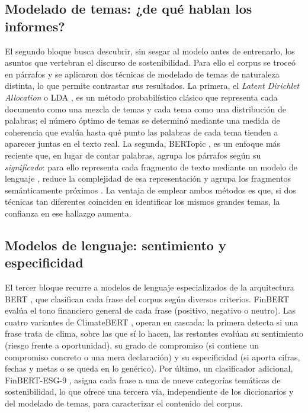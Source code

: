 \subsection{Modelado de temas: ¿de qué hablan los informes?}

El segundo bloque busca descubrir, sin sesgar al modelo antes de entrenarlo, los asuntos que vertebran el
discurso de sostenibilidad. Para ello el corpus se troceó en párrafos y se aplicaron dos
técnicas de modelado de temas de naturaleza distinta, lo que permite contrastar sus resultados.
La primera, el \textit{Latent Dirichlet Allocation} o LDA \parencite{blei2003}, es un método
probabilístico clásico que representa cada documento como una mezcla de temas y cada tema como
una distribución de palabras; el número óptimo de temas se determinó mediante una medida de
coherencia que evalúa hasta qué punto las palabras de cada tema tienden a aparecer juntas en el
texto real. La segunda, BERTopic \parencite{grootendorst2022}, es un enfoque más reciente que,
en lugar de contar palabras, agrupa los párrafos según su \textit{significado}: para ello
representa cada fragmento de texto mediante un modelo de lenguaje \parencite{reimers2019},
reduce la complejidad de esa representación \parencite{mcinnes2018} y agrupa los fragmentos
semánticamente próximos \parencite{campello2013}. La ventaja de emplear ambos métodos es que,
si dos técnicas tan diferentes coinciden en identificar los mismos grandes temas, la confianza
en ese hallazgo aumenta.

\subsection{Modelos de lenguaje: sentimiento y especificidad}

El tercer bloque recurre a modelos de lenguaje especializados de la arquitectura
BERT \parencite{devlin2019,liu2019}, que clasifican cada frase del corpus según diversos
criterios. FinBERT \parencite{araci2019} evalúa el tono financiero general de cada frase
(positivo, negativo o neutro). Las cuatro variantes de ClimateBERT
\parencite{webersinke2022}, operan en cascada:
la primera detecta si una frase trata de clima, sobre las que sí lo hacen, las restantes
evalúan su sentimiento (riesgo frente a oportunidad), su grado de compromiso (si contiene un
compromiso concreto o una mera declaración) y su especificidad (si aporta cifras, fechas y
metas o se queda en lo genérico). Por último, un clasificador adicional, FinBERT-ESG-9
\parencite{yang2020}, asigna cada frase a una de nueve categorías temáticas de sostenibilidad,
lo que ofrece una tercera vía, independiente de los diccionarios y del modelado de temas, para
caracterizar el contenido del corpus.

